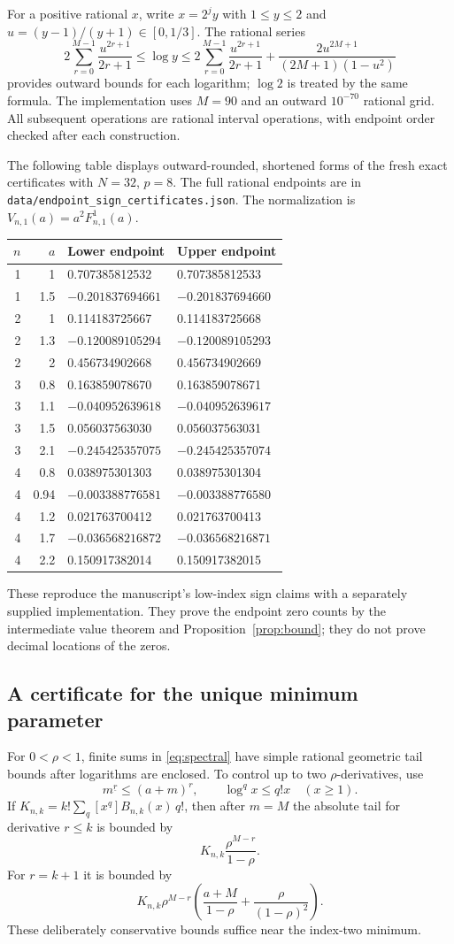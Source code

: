 \documentclass[11pt,letterpaper]{article}
\numberwithin{equation}{section}
\theoremstyle{definition}\newtheorem{definition}[theorem]{Definition}
\theoremstyle{remark}\newtheorem{remark}[theorem]{Remark}
\newcommand{\F}[3]{F_{#1,#2}^{#3}}
\newcommand{\fall}[2]{#1^{\underline{#2}}}
\newcommand{\src}[1]{\nolinkurl{#1}}
\begin{document}
For a positive rational $x$, write $x=2^jy$ with $1\le y\le2$ and $u=(y-1)/(y+1)\in[0,1/3]$. The rational series
\[
 2\sum_{r=0}^{M-1}\frac{u^{2r+1}}{2r+1}
 \le\log y\le
 2\sum_{r=0}^{M-1}\frac{u^{2r+1}}{2r+1}
 +\frac{2u^{2M+1}}{(2M+1)(1-u^2)}
\]
provides outward bounds for each logarithm; $\log2$ is treated by the same formula. The implementation uses $M=90$ and an outward $10^{-70}$ rational grid. All subsequent operations are rational interval operations, with endpoint order checked after each construction.

The following table displays outward-rounded, shortened forms of the fresh exact certificates with $N=32$, $p=8$. The full rational endpoints are in \src{data/endpoint_sign_certificates.json}. The normalization is $V_{n,1}(a)=a^2\F n1{1}(a)$.
\begin{center}\small
\begin{tabular}{@{}rrll@{}}
\toprule
$n$&$a$&Lower endpoint&Upper endpoint\\\midrule
1&1&0.707385812532&0.707385812533\\
1&1.5&$-0.201837694661$&$-0.201837694660$\\
2&1&0.114183725667&0.114183725668\\
2&1.3&$-0.120089105294$&$-0.120089105293$\\
2&2&0.456734902668&0.456734902669\\
3&0.8&0.163859078670&0.163859078671\\
3&1.1&$-0.040952639618$&$-0.040952639617$\\
3&1.5&0.056037563030&0.056037563031\\
3&2.1&$-0.245425357075$&$-0.245425357074$\\
4&0.8&0.038975301303&0.038975301304\\
4&0.94&$-0.003388776581$&$-0.003388776580$\\
4&1.2&0.021763700412&0.021763700413\\
4&1.7&$-0.036568216872$&$-0.036568216871$\\
4&2.2&0.150917382014&0.150917382015\\\bottomrule
\end{tabular}
\end{center}
These reproduce the manuscript's low-index sign claims with a separately supplied implementation. They prove the endpoint zero counts by the intermediate value theorem and Proposition~\ref{prop:bound}; they do not prove decimal locations of the zeros.

\subsection{A certificate for the unique minimum parameter}
For $0<\rho<1$, finite sums in \eqref{eq:spectral} have simple rational geometric tail bounds after logarithms are enclosed. To control up to two $\rho$-derivatives, use
\[
 \fall mr\le(a+m)^r,\qquad \log^q x\le q!x\quad(x\ge1).
\]
If $K_{n,k}=k!\sum_q [x^q]B_{n,k}(x)\,q!$, then after $m=M$ the absolute tail for derivative $r\le k$ is bounded by
\[
 K_{n,k}\frac{\rho^{M-r}}{1-\rho}.
\]
For $r=k+1$ it is bounded by
\[
 K_{n,k}\rho^{M-r}
 \left(\frac{a+M}{1-\rho}+\frac{\rho}{(1-\rho)^2}\right).
\]
These deliberately conservative bounds suffice near the index-two minimum.
\end{document}
